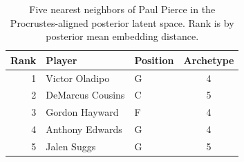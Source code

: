 \begin{table}[htbp]
  \centering\small
  \begin{tabular}{rllc}
    \toprule
    Rank & Player & Position & Archetype \\
    \midrule
    1 & Victor Oladipo & G & 4 \\
    2 & DeMarcus Cousins & C & 5 \\
    3 & Gordon Hayward & F & 4 \\
    4 & Anthony Edwards & G & 4 \\
    5 & Jalen Suggs & G & 5 \\
    \bottomrule
  \end{tabular}
  \caption{Five nearest neighbors of Paul Pierce in the Procrustes-aligned posterior latent space. Rank is by posterior mean embedding distance.}
  \label{tab:Paul_Pierce_neighbors}
\end{table}

